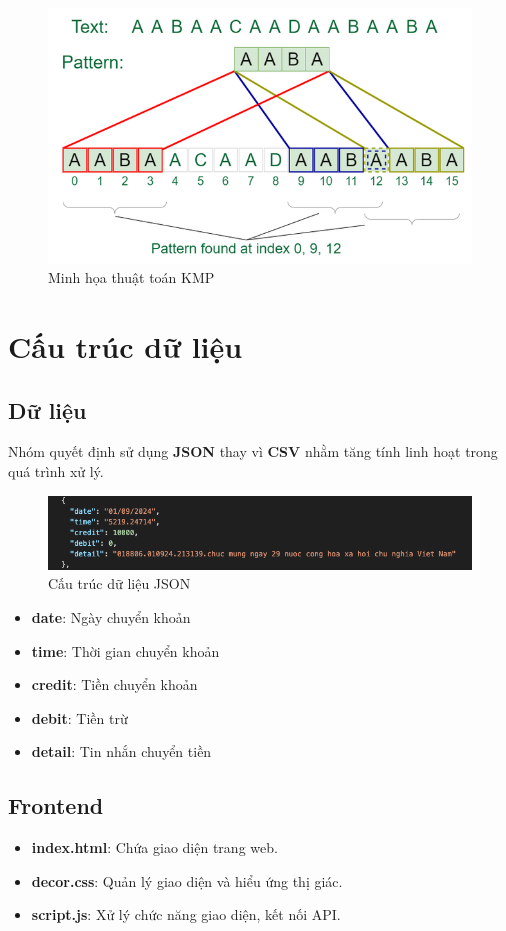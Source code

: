 \begin{figure}[!hbt]
\centering \includegraphics[width=15cm]{Images/img/kmp.png}
\caption{Minh họa thuật toán KMP}
\end{figure}
\newpage
\section{Cấu trúc dữ liệu}
\subsection{Dữ liệu}
Nhóm quyết định sử dụng \textbf{JSON} thay vì \textbf{CSV} nhằm tăng tính linh hoạt trong quá trình xử lý.

\begin{figure}[!ht]
\centering \includegraphics[width=15cm]{Images/img/json.png}
\caption{Cấu trúc dữ liệu JSON}
\end{figure}

\begin{itemize}
\item \textbf{date}: Ngày chuyển khoản
\item \textbf{time}: Thời gian chuyển khoản
\item \textbf{credit}: Tiền chuyển khoản
\item \textbf{debit}: Tiền trừ
\item \textbf{detail}: Tin nhắn chuyển tiền
\end{itemize}

\subsection{Frontend}
\begin{itemize}
\item \textbf{index.html}: Chứa giao diện trang web.
\item \textbf{decor.css}: Quản lý giao diện và hiểu ứng thị giác.
\item \textbf{script.js}: Xử lý chức năng giao diện, kết nối API.
\end{itemize}

